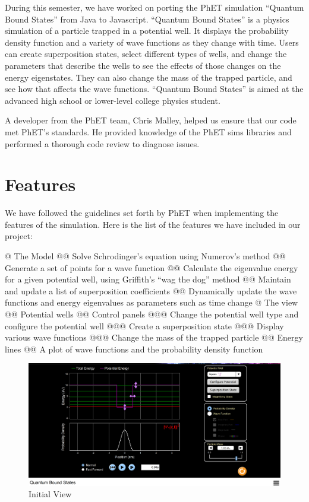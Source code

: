 During this semester, we have worked on porting the PhET simulation ``Quantum Bound States'' from
Java to Javascript. ``Quantum Bound States'' is a physics simulation of a particle trapped in a
potential well.  It displays the probability density function and a variety of wave functions as
they change with time.  Users can create superposition states, select different types of wells, and
change the parameters that describe the wells to see the effects of those changes on the energy
eigenstates.  They can also change the mass of the trapped particle, and see how that affects the
wave functions.  ``Quantum Bound States'' is aimed at the advanced high school or lower-level
college physics student.

A developer from the PhET team, Chris Malley, helped us ensure that our code met PhET's standards.
He provided knowledge of the PhET sims libraries and performed a thorough code review to diagnose
issues.

\section{Features}
We have followed the guidelines set forth by PhET when implementing the features of the simulation.
Here is the list of the features we have included in our project:

\begin{easylist}[itemize]
    @ The Model
    @@ Solve Schrodinger's equation using Numerov's method
    @@ Generate a set of points for a wave function
    @@ Calculate the eigenvalue energy for a given potential well, using Griffith's ``wag the dog'' method
    @@ Maintain and update a list of superposition coefficients
    @@ Dynamically update the wave functions and energy eigenvalues as parameters such as time change
    @ The view
    @@ Potential wells
    @@ Control panels
    @@@ Change the potential well type and configure the potential well
    @@@ Create a superposition state
    @@@ Display various wave functions
    @@@ Change the mass of the trapped particle
    @@ Energy lines
    @@ A plot of wave functions and the probability density function
\end{easylist}

\begin{figure}[H]
    \centering
    \includegraphics[width=\textwidth]{./img/initialscreenshot.png}
    \caption{Initial View}
\end{figure}

